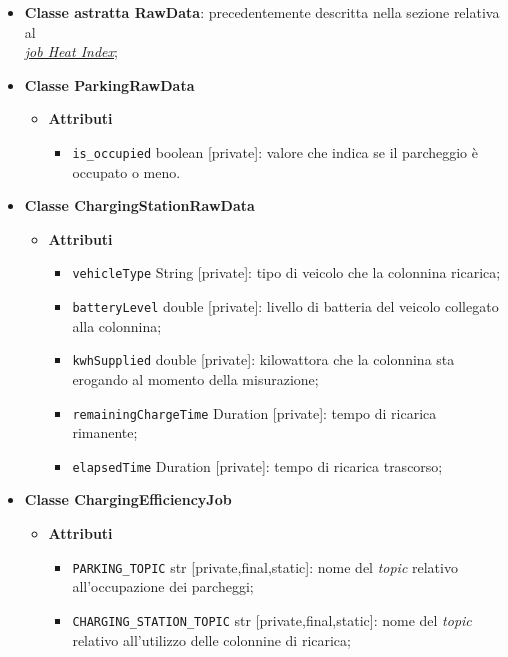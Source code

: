 \begin{itemize}
	\item \textbf{Classe astratta RawData}: precedentemente descritta nella sezione relativa al \\\hyperref[abstract_class_raw_data]{\textit{\underline{job Heat Index}}};
	\item \textbf{Classe ParkingRawData}
	      \begin{itemize}
		      \item \textbf{Attributi}
		            \begin{itemize}
			            \item \texttt{is\_occupied} boolean [private]: valore che indica se il parcheggio è occupato o meno.
		            \end{itemize}
	      \end{itemize}
	\item \textbf{Classe ChargingStationRawData}
	      \begin{itemize}
		      \item \textbf{Attributi}
		            \begin{itemize}
			            \item \texttt{vehicleType} String [private]: tipo di veicolo che la colonnina ricarica;
			            \item \texttt{batteryLevel} double [private]: livello di batteria del veicolo collegato alla colonnina;
			            \item \texttt{kwhSupplied} double [private]: kilowattora che la colonnina sta erogando al momento della misurazione;
			            \item \texttt{remainingChargeTime} Duration [private]: tempo di ricarica rimanente;
			            \item \texttt{elapsedTime} Duration [private]: tempo di ricarica trascorso;
		            \end{itemize}
	      \end{itemize}
	\item \textbf{Classe ChargingEfficiencyJob}
	      \begin{itemize}
		      \item \textbf{Attributi}
		            \begin{itemize}
			            \item \texttt{PARKING\_TOPIC} str [private,final,static]: nome del \textit{topic} relativo all'occupazione dei parcheggi;
			            \item \texttt{CHARGING\_STATION\_TOPIC} str [private,final,static]: nome del \textit{topic} relativo all'utilizzo delle colonnine di ricarica;

\end{itemize}
\end{itemize}
\end{itemize}

